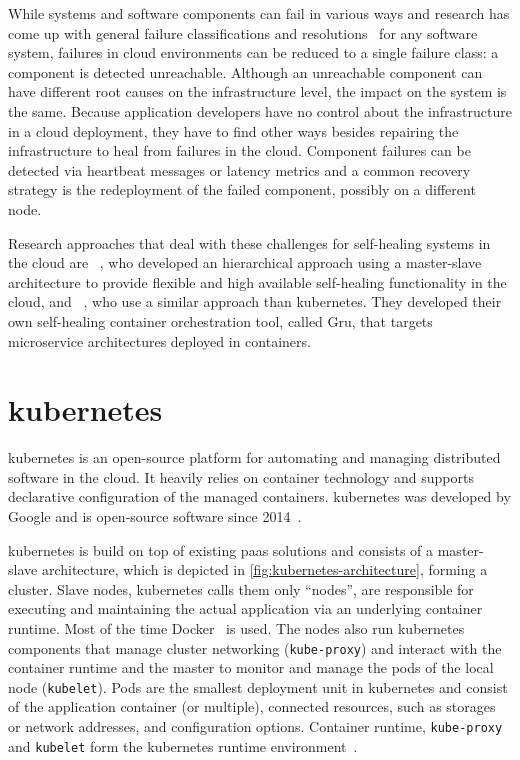   While systems and software components can fail in various ways and research has come up with general failure classifications and resolutions~\cite[Tab.~1]{PsaierSurvey} for any software system, failures in cloud environments can be reduced to a single failure class: a component is detected unreachable.
  Although an unreachable component can have different root causes on the infrastructure level, the impact on the system is the same.
  Because application developers have no control about the infrastructure in a cloud deployment, they have to find other ways besides repairing the infrastructure to heal from failures in the cloud.
  Component failures can be detected via heartbeat messages or latency metrics and a common recovery strategy is the redeployment of the failed component, possibly on a different node.

  Research approaches that deal with these challenges for self-healing systems in the cloud are \citeauthor{StackCloud}~\cite{StackCloud}, who developed an hierarchical approach using a master-slave architecture to provide flexible and high available self-healing functionality in the cloud, and \citeauthor{gru}~\cite{gru}, who use a similar approach than \gls{kubernetes}.
  They developed their own self-healing container orchestration tool, called Gru, that targets microservice architectures deployed in containers.

\section[Kubernetes]{\gls{kubernetes}}\label{sec:kubernetes}
  \Gls{kubernetes} is an open-source platform for automating and managing distributed software in the cloud.
  It heavily relies on container technology and supports declarative configuration of the managed containers.
  \Gls{kubernetes} was developed by Google and is open-source software since 2014~\cite{kubernetes}.

  \Gls{kubernetes} is build on top of existing \gls{paas} solutions and consists of a master-slave architecture, which is depicted in \cref{fig:kubernetes-architecture}, forming a cluster.
  Slave nodes, \gls{kubernetes} calls them only \enquote{nodes}, are responsible for executing and maintaining the actual application via an underlying container runtime.
  Most of the time Docker~\cite{docker} is used.
  The nodes also run \gls{kubernetes} components that manage cluster networking (\texttt{kube-proxy}) and interact with the container runtime and the master to monitor and manage the pods of the local node (\texttt{kubelet}).
  Pods are the smallest deployment unit in \gls{kubernetes} and consist of the application container (or multiple), connected resources, such as storages or network addresses, and configuration options.
  Container runtime, \texttt{kube-proxy} and \texttt{kubelet} form the \gls{kubernetes} runtime environment~\cite{kubernetesdoc}.

